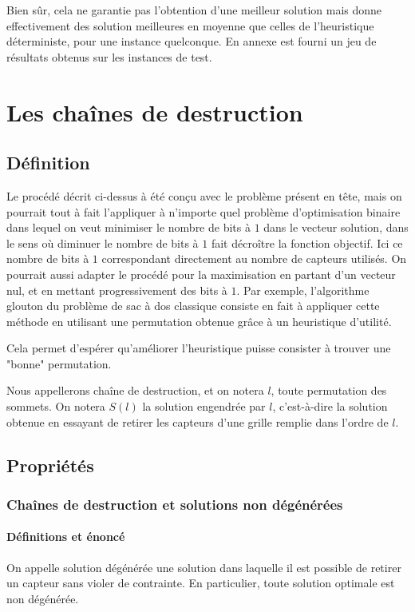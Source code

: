 \documentclass[12pt,a4paper]{article}
\begin{document}
Bien sûr, cela ne garantie pas l'obtention d'une meilleur solution mais donne effectivement des solution meilleures en moyenne que celles de l'heuristique déterministe, pour une instance quelconque. En annexe est fourni un jeu de résultats obtenus sur les instances de test.

\newpage

\section{Les chaînes de destruction}
\subsection{Définition}
Le procédé décrit ci-dessus à été conçu avec le problème présent en tête, mais on pourrait tout à fait l'appliquer à n'importe quel problème d'optimisation binaire dans lequel on veut minimiser le nombre de bits à $1$ dans le vecteur solution, dans le sens où diminuer le nombre de bits à $1$ fait décroître la fonction objectif. Ici ce nombre de bits à $1$ correspondant directement au nombre de capteurs utilisés. On pourrait aussi adapter le procédé pour la maximisation en partant d'un vecteur nul, et en mettant progressivement des bits à $1$. Par exemple, l'algorithme glouton du problème de sac à dos classique consiste en fait à appliquer cette méthode en utilisant une permutation obtenue grâce à un heuristique d'utilité.

Cela permet d'espérer qu'améliorer l'heuristique puisse consister à trouver une "bonne" permutation. 

Nous appellerons chaîne de destruction, et on notera $l$, toute permutation des sommets. On notera $S(l)$ la solution engendrée par $l$,   c'est-à-dire la solution obtenue en essayant de retirer les capteurs d'une grille remplie dans l'ordre de $l$.
\subsection{Propriétés}
\subsubsection{Chaînes de destruction et solutions non dégénérées}
\paragraph{Définitions et énoncé} 
On appelle solution dégénérée une solution dans laquelle il est possible de retirer un capteur sans violer de contrainte. En particulier, toute solution optimale est non dégénérée.
\end{document}
